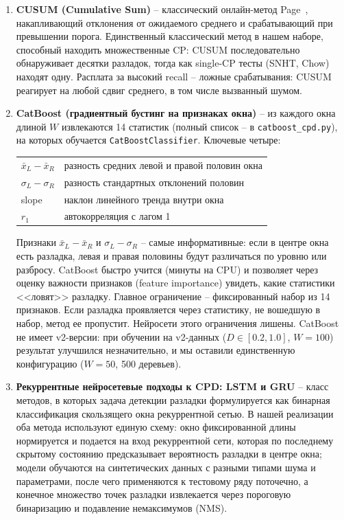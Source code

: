 \documentclass[12pt,a4paper]{article}
\begin{document}
\begin{enumerate}
    \item \textbf{CUSUM (Cumulative Sum)}  -- классический онлайн-метод Page~\cite{page1954}, накапливающий отклонения от ожидаемого среднего и срабатывающий при превышении порога. Единственный классический метод в нашем наборе, способный находить множественные CP: CUSUM последовательно обнаруживает десятки разладок, тогда как single-CP тесты (SNHT, Chow) находят одну. Расплата за высокий recall  -- ложные срабатывания: CUSUM реагирует на любой сдвиг среднего, в том числе вызванный шумом.

    \item \textbf{CatBoost (градиентный бустинг на признаках окна)}  -- из каждого окна длиной $W$ извлекаются 14 статистик (полный список  -- в \texttt{catboost\_cpd.py}), на которых обучается \texttt{CatBoostClassifier}. Ключевые четыре:

    \begin{tabular}{ll}
    $\bar{x}_L - \bar{x}_R$ & разность средних левой и правой половин окна \\
    $\sigma_L - \sigma_R$ & разность стандартных отклонений половин \\
    slope & наклон линейного тренда внутри окна \\
    $r_1$ & автокорреляция с лагом 1 \\
    \end{tabular}

    \smallskip
    Признаки $\bar{x}_L - \bar{x}_R$ и $\sigma_L - \sigma_R$  -- самые информативные: если в центре окна есть разладка, левая и правая половины будут различаться по уровню или разбросу. CatBoost быстро учится (минуты на CPU) и позволяет через оценку важности признаков (feature importance) увидеть, какие статистики <<ловят>> разладку. Главное ограничение -- фиксированный набор из 14 признаков. Если разладка проявляется через статистику, не вошедшую в набор, метод ее пропустит. Нейросети этого ограничения лишены. CatBoost не имеет v2-версии: при обучении на v2-данных ($D \in [0.2, 1.0]$, $W = 100$) результат улучшился незначительно, и мы оставили единственную конфигурацию ($W = 50$, 500 деревьев).
    
    \item \textbf{Рекуррентные нейросетевые подходы к CPD: LSTM и GRU}  -- класс методов, в которых задача детекции разладки формулируется как бинарная классификация скользящего окна рекуррентной сетью. В нашей реализации оба метода используют единую схему: окно фиксированной длины нормируется и подается на вход рекуррентной сети, которая по последнему скрытому состоянию предсказывает вероятность разладки в центре окна; модели обучаются на синтетических данных с разными типами шума и параметрами, после чего применяются к тестовому ряду поточечно, а конечное множество точек разладки извлекается через пороговую бинаризацию и подавление немаксимумов (NMS).


\end{enumerate}
\end{document}
